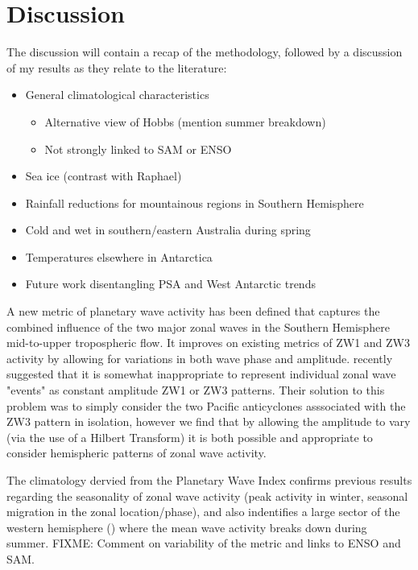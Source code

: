 \section{Discussion}

The discussion will contain a recap of the methodology, followed by a discussion of my results as they relate to the literature:
\begin{itemize}
\item General climatological characteristics
\begin{itemize}
\item Alternative view of Hobbs (mention summer breakdown)
\item Not strongly linked to SAM or ENSO
\end{itemize}
\item Sea ice (contrast with Raphael)
\item Rainfall reductions for mountainous regions in Southern Hemisphere
\item Cold and wet in southern/eastern Australia during spring
\item Temperatures elsewhere in Antarctica
\item Future work disentangling PSA and West Antarctic trends
\end{itemize}

A new metric of planetary wave activity has been defined that captures the combined influence of the two major zonal waves in the Southern Hemisphere mid-to-upper tropospheric flow. It improves on existing metrics of ZW1 and ZW3 activity by allowing for variations in both wave phase and amplitude. \citet{Hobbs2010} recently suggested that it is somewhat inappropriate to represent individual zonal wave "events" as constant amplitude ZW1 or ZW3 patterns. Their solution to this problem was to simply consider the two Pacific anticyclones asssociated with the ZW3 pattern in isolation, however we find that by allowing the amplitude to vary (via the use of a Hilbert Transform) it is both possible and appropriate to consider hemispheric patterns of zonal wave activity.  

The climatology dervied from the Planetary Wave Index confirms previous results regarding the seasonality of zonal wave activity (peak activity in winter, seasonal migration in the zonal location/phase), and also indentifies a large sector of the western hemisphere () where the mean wave activity breaks down during summer. FIXME: Comment on variability of the metric and links to ENSO and SAM.









